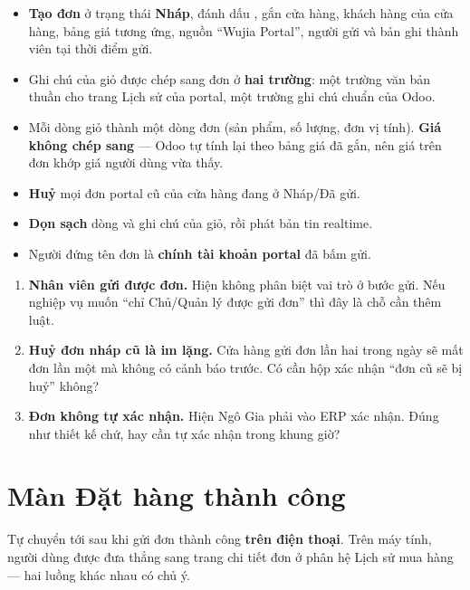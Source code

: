 \begin{itemize}[leftmargin=*]
  \item \textbf{Tạo đơn}  ở trạng thái \textbf{Nháp}, đánh dấu ,
        gắn cửa hàng, khách hàng của cửa hàng, bảng giá tương ứng, nguồn ``Wujia Portal'',
        người gửi và bản ghi thành viên tại thời điểm gửi.
  \item Ghi chú của giỏ được chép sang đơn ở \textbf{hai trường}: một trường văn bản thuần cho
        trang Lịch sử của portal, một trường ghi chú chuẩn của Odoo.
  \item Mỗi dòng giỏ thành một dòng đơn (sản phẩm, số lượng, đơn vị tính). \textbf{Giá không
        chép sang} --- Odoo tự tính lại theo bảng giá đã gắn, nên giá trên đơn khớp giá người
        dùng vừa thấy.
  \item \textbf{Huỷ} mọi đơn portal cũ của cửa hàng đang ở Nháp/Đã gửi.
  \item \textbf{Dọn sạch} dòng và ghi chú của giỏ, rồi phát bản tin realtime.
  \item Người đứng tên đơn là \textbf{chính tài khoản portal} đã bấm gửi.
\end{itemize}

\mhoi

\begin{ask}
\begin{enumerate}[leftmargin=*]
  \item \textbf{Nhân viên gửi được đơn.} Hiện không phân biệt vai trò ở bước gửi. Nếu nghiệp vụ
        muốn ``chỉ Chủ/Quản lý được gửi đơn'' thì đây là chỗ cần thêm luật.
  \item \textbf{Huỷ đơn nháp cũ là im lặng.} Cửa hàng gửi đơn lần hai trong ngày sẽ mất đơn lần
        một mà không có cảnh báo trước. Có cần hộp xác nhận ``đơn cũ sẽ bị huỷ'' không?
  \item \textbf{Đơn không tự xác nhận.} Hiện Ngô Gia phải vào ERP xác nhận. Đúng như thiết kế
        chứ, hay cần tự xác nhận trong khung giờ?
\end{enumerate}
\end{ask}

\section{Màn Đặt hàng thành công}
\medskip

\mvao

Tự chuyển tới sau khi gửi đơn thành công \textbf{trên điện thoại}. Trên máy tính, người dùng
được đưa thẳng sang trang chi tiết đơn ở phân hệ Lịch sử mua hàng --- hai luồng khác nhau có chủ ý.

